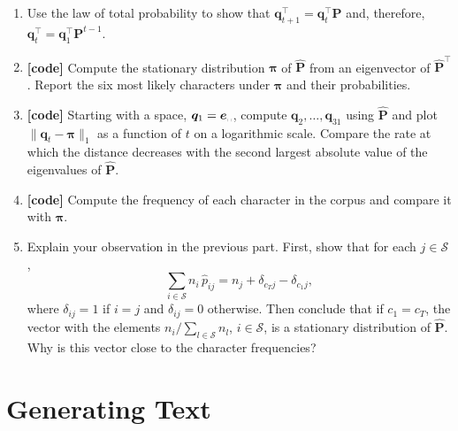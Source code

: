 \documentclass[letterpaper]{article}
\newcommand{\tr}{^\top}
\newcommand{\spc}{\text{\textvisiblespace}}
\begin{document}
\begin{enumerate}
\item Use the law of total probability to show that $\bm{q}_{t+1}\tr = \bm{q}_t\tr \bm{P}$ and, therefore, $\bm{q}_t\tr = \bm{q}_1\tr \bm{P}^{t-1}$.
\item \textbf{[code]} Compute the stationary distribution $\bm{\pi}$ of $\hat{\bm{P}}$ from an eigenvector of $\hat{\bm{P}}\tr$. Report the six most likely characters under $\bm{\pi}$ and their probabilities.
\item \textbf{[code]} Starting with a space, $\bm{q}_1 = \bm{e}_{\spc}$, compute $\bm{q}_2, \dots, \bm{q}_{31}$ using $\hat{\bm{P}}$ and plot $\| \bm{q}_t - \bm{\pi} \|_1$ as a function of $t$ on a logarithmic scale. Compare the rate at which the distance decreases with the second largest absolute value of the eigenvalues of $\hat{\bm{P}}$.
\item \textbf{[code]} Compute the frequency of each character in the corpus and compare it with $\bm{\pi}$.
\item Explain your observation in the previous part. First, show that for each $j \in \mathcal{S}$,
  \[
    \sum_{i \in \mathcal{S}} n_i\, \hat{p}_{ij} = n_j + \delta_{c_T j} - \delta_{c_1 j},
  \]
  where $\delta_{ij} = 1$ if $i = j$ and $\delta_{ij} = 0$ otherwise. Then conclude that if $c_1 = c_T$, the vector with the elements $n_i / \sum_{l \in \mathcal{S}} n_l$, $i \in \mathcal{S}$, is a stationary distribution of $\hat{\bm{P}}$. Why is this vector close to the character frequencies?
\end{enumerate}

\section{Generating Text}
\end{document}
